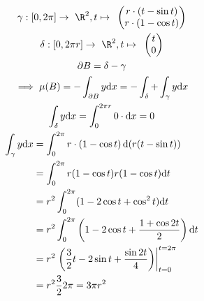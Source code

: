 \begin{bsp*}[ note = Fläche einer Zykloide ]
	\begin{gather*}
		\gamma : [ 0 , 2\pi ] \rightarrow \R^2 , t \mapsto \begin{pmatrix} r \cdot ( t - \sin t ) \\ r \cdot ( 1 - \cos t ) \end{pmatrix} \\
		\delta : [ 0 , 2\pi r ] \rightarrow \R^2 , t \mapsto \begin{pmatrix} t \\ 0 \end{pmatrix} \\
		\partial B = \delta - \gamma \\
		\implies \mu(B) = -\int_{\partial B} y \dd x = -\int_{\delta} + \int_{\gamma} y \dd x \\
		\int_{\delta} y \dd x = \int_0^{2\pi r} 0 \cdot \dd x = 0 \\
		\begin{split}
			\int_{\gamma} y \dd x
				&= \int_0^{2\pi} r \cdot ( 1 - \cos t ) \dd( r( t - \sin t) ) \\
				&= \int_0^{2\pi} r( 1 - \cos t) r ( 1 - \cos t) \dd t \\
				&= r^2 \int_0^{2\pi} ( 1 - 2\cos t + \cos^2 t ) \dd t \\
				&= r^2 \int_0^{2\pi} \left( 1 - 2\cos t + \frac{1 + \cos 2t}{2} \right) \dd t \\
				&= r^2 \left. \left( \frac{3}{2} t - 2\sin t + \frac{\sin 2t}{4} \right) \right|_{t=0}^{t=2\pi} \\
				&= r^2 \frac{3}{2} 2\pi = 3\pi r^2
		\end{split}
	\end{gather*}
\end{bsp*}

